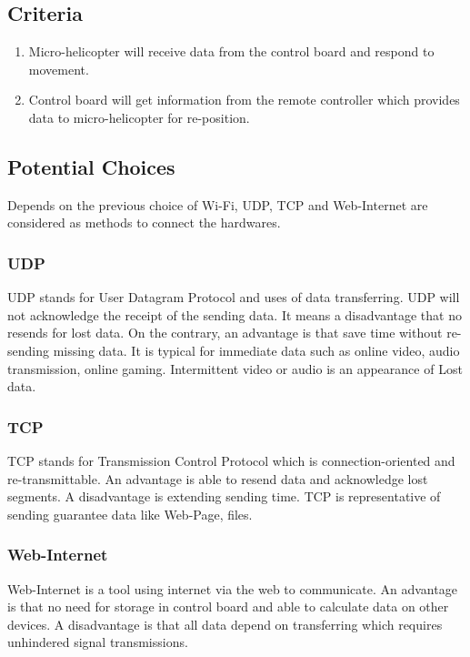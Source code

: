 \documentclass[onecolumn, draftclsnofoot,10pt, compsoc]{IEEEtran}
\begin{document}
\subsection{Criteria}
\begin{enumerate}
\item{Micro-helicopter will receive data from the control board and respond to movement.}
\item{Control board will get information from the remote controller which provides data to micro-helicopter for re-position.}
\end{enumerate}

\subsection{Potential Choices}
Depends on the previous choice of Wi-Fi, UDP, TCP and Web-Internet are considered as methods to connect the hardwares.

\subsubsection{UDP}
UDP\cite{r4} stands for User Datagram Protocol and uses of data transferring.
UDP will not acknowledge the receipt of the sending data.
It means a disadvantage that no resends for lost data.
On the contrary, an advantage is that save time without re-sending missing data.
It is typical for immediate data such as online video, audio transmission, online gaming.
Intermittent video or audio is an appearance of Lost data.

\subsubsection{TCP}
TCP\cite{r5} stands for Transmission Control Protocol which is connection-oriented and re-transmittable.
An advantage is able to resend data and acknowledge lost segments. A disadvantage is extending sending time.
TCP is representative of sending guarantee data like Web-Page, files.

\subsubsection{Web-Internet}
Web-Internet is a tool using internet via the web to communicate.
An advantage is that no need for storage in control board and able to calculate data on other devices.
A disadvantage is that all data depend on transferring which requires unhindered signal transmissions.
\end{document}
